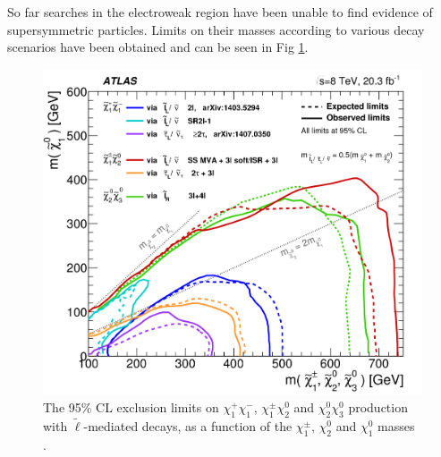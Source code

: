 So far searches in the electroweak region have been unable to find evidence of supersymmetric particles. Limits on their masses according to various decay scenarios have been obtained and can be seen in Fig \ref{fig:summaryplot}.
\begin{figure}[!ht]
	\centering
	\captionsetup{width=0.8\textwidth}
	\includegraphics[scale=0.12]{Chap3/fig_19b}
	\caption[Exlcusion limits on electroweak production at ATLAS]{The 95\% CL exclusion limits on $\chi_1^+\chi_1^-$, $\chi_1^{\pm}\chi_2^0$ and $\chi_2^0\chi_3^0$ production with $\tilde{\ell}$-mediated decays, as a function of the $\chi_1^{\pm},\,\chi_2^0$ and $\chi_1^0$ masses \citep{aad2016search}. }\label{fig:summaryplot}
\end{figure}

